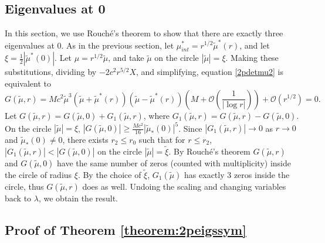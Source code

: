 \documentclass[12pt]{elsarticle}
\theoremstyle{plain}
\theoremstyle{definition}
\theoremstyle{remark}
\numberwithin{theorem}{section}
\numberwithin{equation}{section}
\begin{document}
\subsection{Eigenvalues at 0}\label{sec:asymmeigcount0}

In this section, we use Rouch\'{e}'s theorem to show that there are exactly three eigenvalues at 0. As in the previous section, let $\mu^*_{int} = r^{1/2} \tilde{\mu}^*(r)$, and let $\xi = \frac{1}{2}|\tilde{\mu}^*(0)|$. Let $\mu = r^{1/2} \tilde{\mu}$, and take $\tilde{\mu}$ on the circle $|\tilde{\mu}| = \xi$. Making these substitutions, dividing by $-2 c^2 r^{5/2} X$, and simplifying, equation \cref{2pdetmu2} is equivalent to
\begin{equation}\label{def:eig0G}
G(\tilde{\mu}, r) = M c^2 \tilde{\mu}^3 (\tilde{\mu} + \tilde{\mu}^*(r))(\tilde{\mu} - \tilde{\mu}^*(r))
\left( M + \mathcal{O}\left(\frac{1}{|\log r|} \right) \right)
 + \mathcal{O}\left( r^{1/2} \right) = 0.
\end{equation}
Let $G(\tilde{\mu}, r) = G(\tilde{\mu}, 0) + G_1(\tilde{\mu}, r)$, where $G_1(\tilde{\mu}, r) = G(\tilde{\mu}, r) - G(\tilde{\mu}, 0)$. On the circle $|\tilde{\mu}| = \xi$, $|G(\tilde{\mu}, 0)| \geq \frac{Mc^2}{16}|\tilde{\mu}_*(0)|^5$. Since $|G_1(\tilde{\mu}, r)| \rightarrow 0$ as $r \rightarrow 0$ and $\tilde{\mu}_*(0) \neq 0$, there exists $r_2 \leq r_0$ such that for $r \leq r_2$, $|G_1(\tilde{\mu}, r)| < |G(\tilde{\mu}, 0)|$ on the circle $|\tilde{\mu}| = \tilde{\xi}$. By Rouch\'{e}'s theorem $G(\tilde{\mu}, r)$ and $G(\tilde{\mu}, 0)$ have the same number of zeros (counted with multiplicity) inside the circle of radius $\xi$. By the choice of $\tilde{\xi}$, $G_1(\tilde{\mu})$ has exactly 3 zeros inside the circle, thus $G(\tilde{\mu}, r)$ does as well. Undoing the scaling and changing variables back to $\lambda$, we obtain the result.

\subsection{Proof of Theorem \ref{theorem:2peigssym}}
\end{document}
